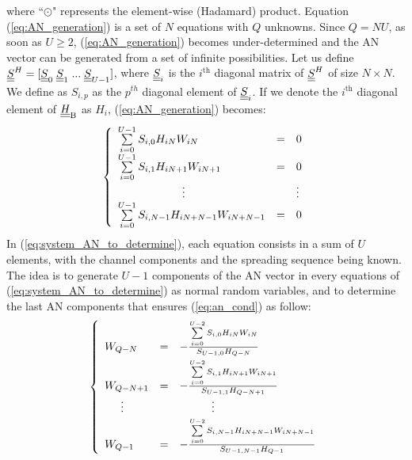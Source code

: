 \documentclass[conference]{IEEEtran}
\begin{document}
where ``$\odot$" represents the element-wise (Hadamard) product. Equation (\ref{eq:AN_generation}) is a set of $N$ equations with $Q$ unknowns. Since $Q = NU$, as soon as $U\geq 2$, (\ref{eq:AN_generation}) becomes under-determined and the AN vector can be generated from a set of infinite possibilities. Let us define $\underline{\underline{S}}^H = [\underline{\underline{S}}_0 \; \underline{\underline{S}}_1 \; ... \; \underline{\underline{S}}_{U-1}]$, where $\underline{\underline{S}}_i$ is the $i^{\text{th}}$ diagonal matrix of $\underline{\underline{S}}^H$ of size $N\times N$. We define as $S_{i,p}$ as the $p^{th}$ diagonal element of $\underline{\underline{S}}_i$. If we denote the $i^{\text{th}}$ diagonal element of $\underline{\underline{H}}_{\text{B}}$ as $H_i$, (\ref{eq:AN_generation}) becomes: 
\begin{equation}
\setlength{\jot}{15pt}
\begin{split}
\left\{
\begin{array}{lll}
    \sum\limits_{i=0}^{\small{U-1}} S_{i,0} H_{iN} W_{iN} &=& 0 \\[2pt]
    \sum\limits_{i=0}^{U-1} S_{i,1}H_{iN+1} W_{iN+1} &=& 0 \\[2pt]
    \hspace{.8in}\vdots  && \vdots \\
    \sum\limits_{i=0}^{U-1} S_{i,N-1}H_{iN +N-1} W_{iN+N-1} &=& 0
\end{array}
\right.
\end{split}
\label{eq:system_AN_to_determine}
\end{equation}
In (\ref{eq:system_AN_to_determine}), each equation consists in a sum of $U$ elements, with the channel components and the spreading sequence being known. The idea is to generate $U-1$ components of the AN vector in every equations of (\ref{eq:system_AN_to_determine}) as normal random variables, and to determine the last AN components that ensures (\ref{eq:an_cond}) as follow:
\begin{equation}
\setlength{\jot}{5pt}
\begin{split}
\left\{
\begin{array}{lll}
    W_{Q-N}  &=& - \frac{\sum\limits_{i=0}^{U-2}  S_{i,0} H_{iN} W_{iN}}{ S_{U-1,0} H_{Q-N}} \\[5pt]
    W_{Q-N+1}& =&  - \frac {\sum\limits_{i=0}^{U-2}  S_{i,1}H_{iN+1} W_{iN+1}}{ S_{U-1,1}H_{Q-N+1}} \\[2pt]
    \hspace{.2in} \vdots  &&  \hspace{.4in} \vdots \\[2pt]
    W_{Q-1} &=&  - \frac{\sum\limits_{i=0}^{U-2}  S_{i,N-1}H_{iN +N-1} W_{iN+N-1}}{ S_{U-1,N-1}H_{Q-1}}
\end{array}
\right.
\end{split}
\label{eq:system_AN_determined}
\end{equation}
\end{document}
